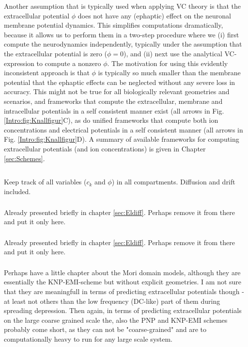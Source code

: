 {Another assumption that is typically used when applying VC theory is that the extracellular potential $\phi$ does not have any (ephaptic) effect on the neuronal membrane potential dynamics. This simplifies computations dramatically, because it allows us to perform them in a two-step procedure where we (i) first compute the neurodynamics independently, typically under the assumption that the extracellular potential is zero ($\phi = 0$), and (ii) next use the analytical VC-expression to compute a nonzero $\phi$. The motivation for using this evidently inconsistent approach is that $\phi$ is typically so much smaller than the membrane potential that the ephaptic effects can be neglected without any severe loss in accuracy. This might not be true for all biologically relevant geometries and scenarios, and frameworks that compute the extracellular, membrane and intracellular potentials in a self consistent manner exist (all arrows in Fig. \ref{Intro:fig:Knallfigur}C), as do unified frameworks that compute both ion concentrations and electrical potentials in a self consistent manner (all arrows in Fig. \ref{Intro:fig:Knallfigur}D). A summary of available frameworks for computing extracellular potentials (and ion concentrations) is given in Chapter \ref{sec:Schemes}.


\subsection{}
Keep track of all variables ($c_k$ and $\phi$) in all compartments. Diffusion and drift included. 

\subsubsection{}
Already presented briefly in chapter \ref{sec:Eldiff}. Perhaps remove it from there and put it only here. 

\subsubsection{}
Already presented briefly in chapter \ref{sec:Eldiff}. Perhaps remove it from there and put it only here. 

\subsubsection{}
Perhaps have a little chapter about the Mori domain models, although they are essentially the KNP-EMI-scheme but without explicit geometries. I am not sure that they are meaningfull in terms of predicting extracellular potentials though - at least not others than the low frequency (DC-like) part of them during spreading depression. Then again, in terms of predicting extracellular potentials on the large coarse grained scale the, also the PNP and KNP-EMI schemes probably come short, as they can not be "coarse-grained" and are to computationally heavy to run for any large scale system. 

}
